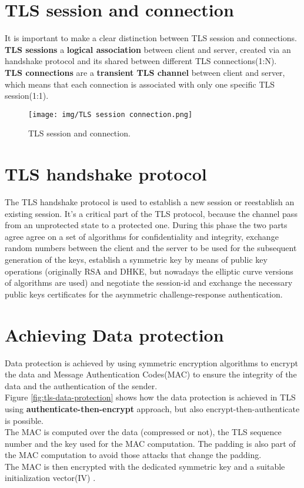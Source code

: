 \section{TLS session and connection}
It is important to make a clear distinction between TLS session and
connections.\\
\textbf{TLS sessions} a \textbf{logical association} between client and server, created
via an handshake protocol and its shared between different TLS
connections(1:N).\\
\textbf{TLS connections} are a \textbf{transient TLS channel} between client and server,
which means that each connection is associated with only one specific
TLS session(1:1).

\begin{figure}[H]
  \centering
  \texttt{[image: img/TLS session connection.png]}
  \caption{TLS session and connection.}
  \label{fig:tls-session-and-connection}
\end{figure}
\section{TLS handshake protocol}
The TLS handshake protocol is used to establish a new session or
reestablish an existing session. It's a critical part of the TLS
protocol, because the channel pass from an unprotected state to a
protected one. During this phase the two parts agree
agree on a set of algorithms for confidentiality and integrity,
exchange random numbers between the client and the server to be used
for the subsequent generation of the keys, establish a symmetric key
by means of public key operations (originally RSA and DHKE, but
nowadays the elliptic curve versions of algorithms are used) and negotiate the
session-id and exchange the necessary public keys certificates for the
asymmetric challenge-response authentication.

\section{Achieving Data protection}
Data protection is achieved by using symmetric encryption algorithms
to encrypt the data and Message Authentication Codes(MAC) to ensure
the integrity of the data and the authentication of the sender.\\
Figure \ref{fig:tls-data-protection} shows how the data protection is 
achieved in TLS using \textbf{authenticate-then-encrypt} approach, but
also encrypt-then-authenticate is possible.\\
The MAC is computed over the data (compressed or not), the TLS sequence 
number and the key used for the MAC computation. The padding is also
part of the MAC computation to avoid those attacks that change the
padding.\\
The MAC is then encrypted with the dedicated symmetric key and a
suitable initialization vector(IV) .

